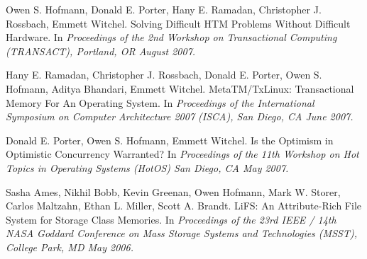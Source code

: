 \begin{bibsection}
\item Owen S. Hofmann, Donald E. Porter, Hany E. Ramadan, Christopher J.
Rossbach, Emmett Witchel.
Solving Difficult HTM Problems Without Difficult Hardware.
In \emph{Proceedings of the 2nd Workshop on Transactional Computing
(TRANSACT), Portland, OR August 2007.} 
 
\item Hany E. Ramadan, Christopher J. Rossbach, Donald E. Porter, Owen S.
Hofmann, Aditya Bhandari, Emmett Witchel.
MetaTM/TxLinux: Transactional Memory For An Operating System.
In \emph{Proceedings of the International Symposium on Computer
Architecture 2007 (ISCA), San Diego, CA June 2007.} 
 
\item Donald E. Porter, Owen S. Hofmann, Emmett Witchel.
Is the Optimism in Optimistic Concurrency Warranted? 
In \emph{Proceedings of the 11th Workshop on Hot Topics in Operating
Systems (HotOS) San Diego, CA May 2007.} 
 
\item Sasha Ames, Nikhil Bobb, Kevin Greenan, Owen Hofmann, Mark W. Storer,
Carlos Maltzahn, Ethan L. Miller, Scott A. Brandt.
LiFS: An Attribute-Rich File System for Storage Class Memories.
In \emph{Proceedings of the 23rd IEEE / 14th NASA Goddard Conference on
Mass Storage Systems and Technologies (MSST), College Park, MD May
2006.} 
\end{bibsection}

